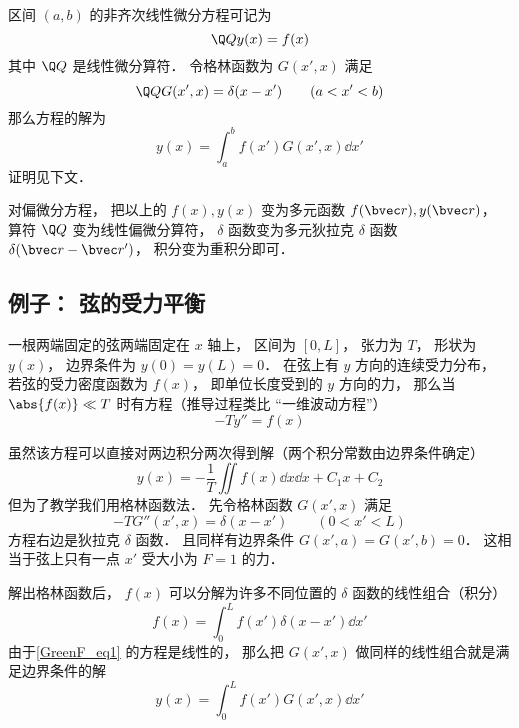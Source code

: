 

区间 $(a,b)$ 的非齐次线性微分方程可记为
\begin{equation}\label{GreenF_eq5}
\Q Q y(x) = f(x)
\end{equation}
其中 $\Q Q$ 是线性微分算符． 令格林函数为 $G(x', x)$ 满足
\begin{equation}\label{GreenF_eq7}
\Q Q G(x', x) = \delta(x - x') \qquad (a < x' < b)
\end{equation}
那么方程的解为
\begin{equation}\label{GreenF_eq4}
y(x) = \int_a^b f(x') G(x', x) \dd{x'}
\end{equation}
证明见下文．

对偏微分方程， 把以上的 $f(x), y(x)$ 变为多元函数 $f(\bvec r), y(\bvec r)$， 算符 $\Q Q$ 变为线性偏微分算符， $\delta$ 函数变为多元狄拉克 $\delta$ 函数 $\delta(\bvec r - \bvec r')$， 积分变为重积分即可．

\subsection{例子： 弦的受力平衡}

一根两端固定的弦两端固定在 $x$ 轴上， 区间为 $[0, L]$， 张力为 $T$， 形状为 $y(x)$， 边界条件为 $y(0) = y(L) = 0$． 在弦上有 $y$ 方向的连续受力分布， 若弦的受力密度函数为 $f(x)$， 即单位长度受到的 $y$ 方向的力， 那么当 $\abs{f(x)} \ll T$ 时有方程（推导过程类比 “一维波动方程”）
\begin{equation}\label{GreenF_eq1}
-T y'' = f(x)
\end{equation}

虽然该方程可以直接对两边积分两次得到解（两个积分常数由边界条件确定）
\begin{equation}\label{GreenF_eq14}
y(x) = -\frac{1}{T}\iint f(x) \dd{x}\dd{x} + C_1 x + C_2
\end{equation}
但为了教学我们用格林函数法． 先令格林函数 $G(x', x)$ 满足
\begin{equation}\label{GreenF_eq2}
-T G''(x', x) = \delta(x - x') \qquad (0 < x' < L)
\end{equation}
方程右边是狄拉克 $\delta$ 函数． 且同样有边界条件 $G(x', a) = G(x', b) = 0$． 这相当于弦上只有一点 $x'$ 受大小为 $F = 1$ 的力．

解出格林函数后， $f(x)$ 可以分解为许多不同位置的 $\delta$ 函数的线性组合（积分）
\begin{equation}
f(x) = \int_0^L f(x') \delta(x - x') \dd{x'}
\end{equation}
由于\autoref{GreenF_eq1} 的方程是线性的， 那么把 $G(x', x)$ 做同样的线性组合就是满足边界条件的解
\begin{equation}\label{GreenF_eq3}
y(x) = \int_0^L f(x') G(x', x) \dd{x'}
\end{equation}

